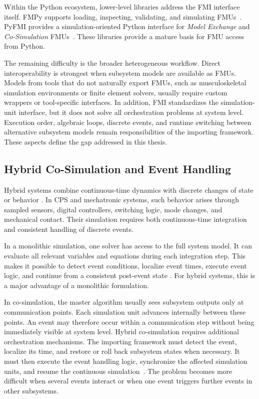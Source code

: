 Within the Python ecosystem, lower-level libraries address the \ac{FMI} interface itself.
FMPy supports loading, inspecting, validating, and simulating \acp{FMU}~\cite{dassault_systemes__catia-systems_fmpy_2026}.
PyFMI provides a simulation-oriented Python interface for \emph{Model Exchange} and \emph{Co-Simulation} \acp{FMU}~\cite{andersson_pyfmi_2016}.
These libraries provide a mature basis for FMU access from Python.

The remaining difficulty is the broader heterogeneous workflow.
Direct interoperability is strongest when subsystem models are available as \acp{FMU}.
Models from tools that do not naturally export \acp{FMU}, such as musculoskeletal simulation environments or finite element solvers, usually require custom wrappers or tool-specific interfaces.
In addition, \ac{FMI} standardizes the simulation-unit interface, but it does not solve all orchestration problems at system level.
Execution order, algebraic loops, discrete events, and runtime switching between alternative subsystem models remain responsibilities of the importing framework.
These aspects define the gap addressed in this thesis.

\subsection{Hybrid Co-Simulation and Event Handling}

Hybrid systems combine continuous-time dynamics with discrete changes of state or behavior \cite{cellier_combined_1986,derler_modeling_2012}.
In \ac{CPS} and mechatronic systems, such behavior arises through sampled sensors, digital controllers, switching logic, mode changes, and mechanical contact.
Their simulation requires both continuous-time integration and consistent handling of discrete events.

In a monolithic simulation, one solver has access to the full system model.
It can evaluate all relevant variables and equations during each integration step.
This makes it possible to detect event conditions, localize event times, execute event logic, and continue from a consistent post-event state \cite{Modelica_Fritzson}.
For hybrid systems, this is a major advantage of a monolithic formulation.

In co-simulation, the master algorithm usually sees subsystem outputs only at communication points.
Each simulation unit advances internally between these points.
An event may therefore occur within a communication step without being immediately visible at system level.
Hybrid co-simulation requires additional orchestration mechanisms.
The importing framework must detect the event, localize its time, and restore or roll back subsystem states when necessary.
It must then execute the event handling logic, synchronize the affected simulation units, and resume the continuous simulation~\cite{broman_determinate_2013}.
The problem becomes more difficult when several events interact or when one event triggers further events in other subsystems.

